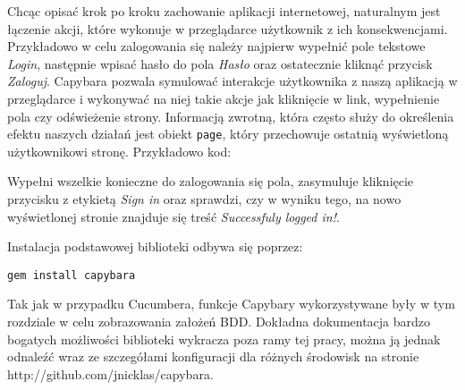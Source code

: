       Chcąc opisać krok po kroku zachowanie aplikacji internetowej, naturalnym jest łączenie akcji, które wykonuje w przeglądarce użytkownik z ich konsekwencjami. Przykładowo w celu zalogowania się należy najpierw wypełnić pole tekstowe \emph{Login}, następnie wpisać hasło do pola \emph{Hasło} oraz ostatecznie kliknąć przycisk \emph{Zaloguj}. Capybara pozwala symulować interakcje użytkownika z naszą aplikacją w przeglądarce i wykonywać na niej takie akcje jak kliknięcie w link, wypełnienie pola czy odświeżenie strony.
      Informacją zwrotną, która często służy do określenia efektu naszych działań jest obiekt \verb+page+, który przechowuje ostatnią wyświetloną użytkownikowi stronę. Przykładowo kod:
      
      
      
      Wypełni wszelkie konieczne do zalogowania się pola, zasymuluje kliknięcie przycisku z etykietą \emph{Sign in} oraz sprawdzi, czy w wyniku tego, na nowo wyświetlonej stronie znajduje się treść \emph{Successfuly logged in!}.
      
      Instalacja podstawowej biblioteki odbywa się poprzez:
      
\begin{lstlisting}
gem install capybara
\end{lstlisting}
      
      Tak jak w przypadku Cucumbera, funkcje Capybary wykorzystywane były w tym rozdziale w celu zobrazowania założeń BDD. Dokładna dokumentacja bardzo bogatych możliwości biblioteki wykracza poza ramy tej pracy, można ją jednak odnaleźć wraz ze szczegółami konfiguracji dla różnych środowisk na stronie http://github.com/jnicklas/capybara.
      